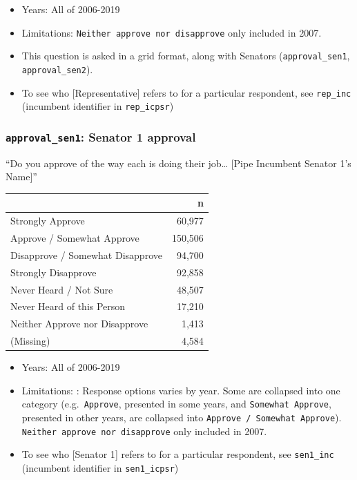 \documentclass[10pt,article,oneside]{memoir}
\theoremstyle{definition}
\begin{document}
\begin{itemize}
\tightlist
\item
  Years: All of 2006-2019
\item
  Limitations: \texttt{Neither\ approve\ nor\ disapprove} only included
  in 2007.
\item
  This question is asked in a grid format, along with Senators
  (\texttt{approval\_sen1}, \texttt{approval\_sen2}).
\item
  To see who {[}Representative{]} refers to for a particular respondent,
  see \texttt{rep\_inc} (incumbent identifier in \texttt{rep\_icpsr})
\end{itemize}

\hypertarget{approval_sen1-senator-1-approval}{%
\subsubsection{\texorpdfstring{\texttt{approval\_sen1}: Senator 1
approval}{approval\_sen1: Senator 1 approval}}\label{approval_sen1-senator-1-approval}}

``Do you approve of the way each is doing their job\ldots{} {[}Pipe
Incumbent Senator 1's Name{]}''

\begin{table}[H]
\centering
\begin{tabular}{lr}
\toprule
 & n\\
\midrule
Strongly Approve & 60,977\\
Approve / Somewhat Approve & 150,506\\
Disapprove / Somewhat Disapprove & 94,700\\
Strongly Disapprove & 92,858\\
Never Heard / Not Sure & 48,507\\
Never Heard of this Person & 17,210\\
Neither Approve nor Disapprove & 1,413\\
(Missing) & 4,584\\
\bottomrule
\end{tabular}
\end{table}

\begin{itemize}
\tightlist
\item
  Years: All of 2006-2019
\item
  Limitations: : Response options varies by year. Some are collapsed
  into one category (e.g.~\texttt{Approve}, presented in some years, and
  \texttt{Somewhat\ Approve}, presented in other years, are collapsed
  into \texttt{Approve\ /\ Somewhat\ Approve}).
  \texttt{Neither\ approve\ nor\ disapprove} only included in 2007.
\item
  To see who {[}Senator 1{]} refers to for a particular respondent, see
  \texttt{sen1\_inc} (incumbent identifier in \texttt{sen1\_icpsr})
\end{itemize}
\end{document}
